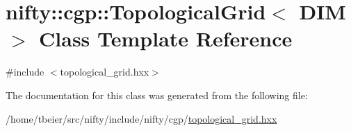 \hypertarget{classnifty_1_1cgp_1_1TopologicalGrid}{}\section{nifty\+:\+:cgp\+:\+:Topological\+Grid$<$ D\+IM $>$ Class Template Reference}
\label{classnifty_1_1cgp_1_1TopologicalGrid}


{\ttfamily \#include $<$topological\+\_\+grid.\+hxx$>$}



The documentation for this class was generated from the following file\+:\begin{DoxyCompactItemize}
\item 
/home/tbeier/src/nifty/include/nifty/cgp/\hyperlink{topological__grid_8hxx}{topological\+\_\+grid.\+hxx}\end{DoxyCompactItemize}
